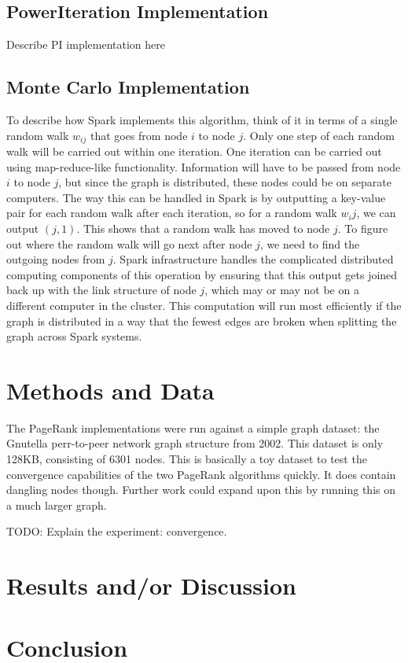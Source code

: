 \documentclass[letterpaper, 10 pt, conference]{ieeeconf}  %
\begin{document}
\subsection{PowerIteration Implementation}
Describe PI implementation here

\subsection{Monte Carlo Implementation}
To describe how Spark implements this algorithm, think of it in terms of a single random walk $w_{ij}$ that goes from node $i$ to node $j$. Only one step of each random walk will be carried out within one iteration. One iteration can be carried out using map-reduce-like functionality. Information will have to be passed from node $i$ to node $j$, but since the graph is distributed, these nodes could be on separate computers. The way this can be handled in Spark is by outputting a key-value pair for each random walk after each iteration, so for a random walk $w_ij$, we can output $(j, 1)$. This shows that a random walk has moved to node $j$. To figure out where the random walk will go next after node $j$, we need to find the outgoing nodes from $j$. Spark infrastructure handles the complicated distributed computing components of this operation by ensuring that this output gets joined back up with the link structure of node $j$, which may or may not be on a different computer in the cluster. This computation will run most efficiently if the graph is distributed in a way that the fewest edges are broken when splitting the graph across Spark systems.

\section{Methods and Data}
The PageRank implementations were run against a simple graph dataset: the Gnutella perr-to-peer network graph structure from 2002. This dataset is only 128KB, consisting of 6301 nodes. This is basically a toy dataset to test the convergence capabilities of the two PageRank algorithms quickly. It does contain dangling nodes though. Further work could expand upon this by running this on a much larger graph.

TODO: Explain the experiment: convergence.

\section{Results and/or Discussion}




\section{Conclusion}





\end{document}
